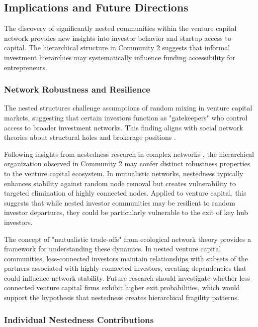 
\subsection{Implications and Future Directions}

The discovery of significantly nested communities within the venture capital network provides new insights into investor behavior and startup access to capital. The hierarchical structure in Community 2 suggests that informal investment hierarchies may systematically influence funding accessibility for entrepreneurs.

\subsubsection{Network Robustness and Resilience}

The nested structures challenge assumptions of random mixing in venture capital markets, suggesting that certain investors function as "gatekeepers" who control access to broader investment networks. This finding aligns with social network theories about structural holes and brokerage positions \cite{Borgatti2011}.

Following insights from nestedness research in complex networks \cite{Mariani2019}, the hierarchical organization observed in Community 2 may confer distinct robustness properties to the venture capital ecosystem. In mutualistic networks, nestedness typically enhances stability against random node removal but creates vulnerability to targeted elimination of highly connected nodes. Applied to venture capital, this suggests that while nested investor communities may be resilient to random investor departures, they could be particularly vulnerable to the exit of key hub investors.

The concept of "mutualistic trade-offs" from ecological network theory provides a framework for understanding these dynamics. In nested venture capital communities, less-connected investors maintain relationships with subsets of the partners associated with highly-connected investors, creating dependencies that could influence network stability. Future research should investigate whether less-connected venture capital firms exhibit higher exit probabilities, which would support the hypothesis that nestedness creates hierarchical fragility patterns.

\subsubsection{Individual Nestedness Contributions}

